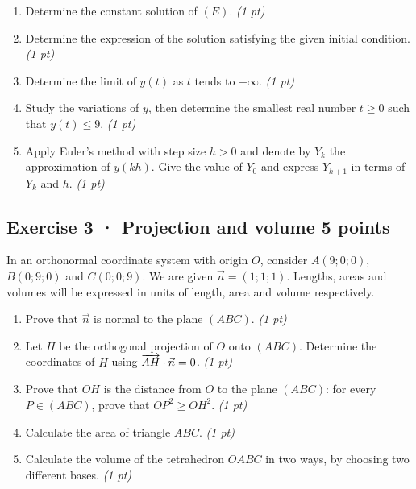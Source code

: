 \begin{enumerate}

\item Determine the constant solution of $(E)$. \hfill\textit{(1 pt)}

\item Determine the expression of the solution satisfying the given initial condition. \hfill\textit{(1 pt)}

\item Determine the limit of $y(t)$ as $t$ tends to $+\infty$. \hfill\textit{(1 pt)}

\item Study the variations of $y$, then determine the smallest real number $t\ge0$ such that $y(t)\le9$. \hfill\textit{(1 pt)}

\item Apply Euler's method with step size $h>0$ and denote by $Y_k$ the approximation of $y(kh)$. Give the value of $Y_0$ and express $Y_{k+1}$ in terms of $Y_k$ and $h$. \hfill\textit{(1 pt)}

\end{enumerate}

\clearpage{}\par

\subsection*{Exercise 3 · Projection and volume \hfill 5 points}In an orthonormal coordinate system with origin $O$, consider $A(9;0;0)$, $B(0;9;0)$ and $C(0;0;9)$. We are given $\vec n=(1;1;1)$. Lengths, areas and volumes will be expressed in units of length, area and volume respectively.

\begin{enumerate}

\item Prove that $\vec n$ is normal to the plane $(ABC)$. \hfill\textit{(1 pt)}

\item Let $H$ be the orthogonal projection of $O$ onto $(ABC)$. Determine the coordinates of $H$ using $\overrightarrow{AH}\cdot\vec n=0$. \hfill\textit{(1 pt)}

\item Prove that $OH$ is the distance from $O$ to the plane $(ABC)$: for every $P\in(ABC)$, prove that $OP^2\ge OH^2$. \hfill\textit{(1 pt)}

\item Calculate the area of triangle $ABC$. \hfill\textit{(1 pt)}

\item Calculate the volume of the tetrahedron $OABC$ in two ways, by choosing two different bases. \hfill\textit{(1 pt)}

\end{enumerate}

